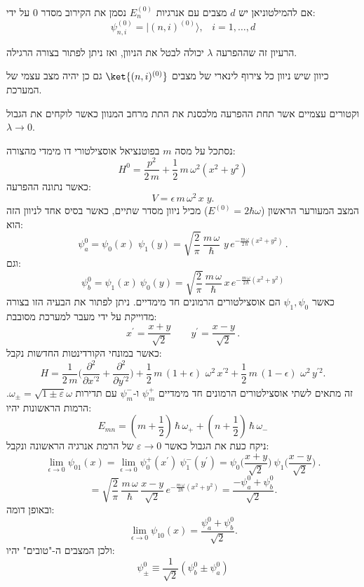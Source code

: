 \documentclass{tstextbook}
\begin{document}
\begin{symbolize}
אם להמילטוניאן יש \(d\) מצבים עם אנרגיות \(E_{n}^{(0)}\) נסמן את הקירוב מסדר 0 על ידי:
$$\psi_{n,i}^{(0)}=|(n,i)^{(0)}\rangle,\;\;\;i=1,\ldots,d$$

\end{symbolize}
הרעיון זה שההפרעה \(\lambda\) יכולה לבטל את הניוון, ואז ניתן לפתור בצורה הרגילה.

\begin{proposition}
כיוון שיש ניוון כל צירוף לינארי של מצבים \(\ket{(n,i)^{(0)}}\) גם כן יהיה מצב עצמי של המערכת.

\end{proposition}
\begin{definition}
וקטורים עצמיים אשר תחת ההפרעה מלכסנת את התת מרחב המנוון כאשר לוקחים את הגבול \(\lambda\to 0\).

\end{definition}
\begin{example}
נסתכל על מסה \(m\) בפוטנציאל אוסצילטורי דו מימדי מהצורה:
$$H^{0}=\frac{p^{2}}{2\,m}+\frac{1}{2}\,m\,\omega^{2}\left(x^{2}+y^{2}\right)$$
כאשר נתונה ההפרעה:
$$V=\epsilon\,m\,\omega^{2}\,x\;y.$$
המצב המעורער הראשון (\(E^{(0)}=2\hbar \omega\)) מכיל ניוון מסדר שתיים, כאשר בסיס אחד לניוון הזה הוא:
$$\psi_{a}^{0}=\psi_{0}(x)\,\,\psi_{1}(y)=\sqrt{\frac{2}{\pi}}\,\frac{m\,\omega}{\hbar}\,\,y\,e^{-\frac{m\,\omega}{2\,\hbar}\left(x^{2}+y^{2}\right)}\,.$$
וגם:
$$\psi_{b}^{0}=\psi_{1}(x)\ \psi_{0}(y)=\sqrt{\frac{2}{\pi}}\,\frac{m\,\omega}{\hbar}\,x\,e^{-\frac{m\,\omega}{2\,\hbar}\left(x^{2}+y^{2}\right)}$$
כאשר \(\psi_{1},\psi_{0}\) הם אוסצילטורים הרמונים חד מימדיים. ניתן לפתור את הבעיה הזו בצורה מדוייקת על ידי מעבר למערכת מסובבת:
$$x^{\prime}=\frac{x+y}{\sqrt{2}}\qquad y^{\prime}=\frac{x-y}{\sqrt{2}}\,.$$
כאשר במונחי הקורדינטות החדשות נקבל:
$$H=\frac{1}{2\,m}\bigg(\frac{\partial^{2}}{\partial x^{\prime2}}+\frac{\partial^{2}}{\partial y^{\prime2}}\bigg)+\frac{1}{2}\,m\,(1+\epsilon)\,\,\omega^{2}\,x^{\prime2}+\frac{1}{2}\,m\,(1-\epsilon)\,\,\omega^{2}\,y^{\prime2}.$$
זה מתאים לשתי אוסצילטורים הרמונים חד מימדיים \(\psi_{m}^{+}\) ו-\(\psi_{m}^{-}\) עם תדירות \(\omega_{\pm}=\sqrt{ 1\pm \varepsilon }\omega\). הרמות הראשונות יהיו:
$$E_{m n}=\left(m+\frac{1}{2}\right)\,\hbar\,\omega_{+}+\left(n+\frac{1}{2}\right)\,\hbar\,\omega_{-}$$
ניקח כעת את הגבול כאשר \(\varepsilon\to 0\) של הרמת אנרגיה הראשונה ונקבל:
$$\operatorname*{lim}_{\epsilon\rightarrow0}\psi_{01}(x)=\operatorname*{lim}_{\epsilon\rightarrow0}\psi_{0}^{+}(x^{\prime})\ \psi_{1}^{-}(y^{\prime})=\psi_{0}\bigg(\frac{x+y}{\sqrt{2}}\bigg)\ \psi_{1}\bigg(\frac{x-y}{\sqrt{2}}\bigg)\ .$$$$=\sqrt{\frac{2}{\pi}}\,\frac{m\,\omega}{\hbar}\,\frac{x-y}{\sqrt{2}}\,e^{-\frac{m\,\omega}{2\hbar}\left(x^{2}+y^{2}\right)}=\frac{-\psi_{a}^{0}+\psi_{b}^{0}}{\sqrt{2}}.$$
ובאופן דומה:
$$\operatorname*{lim}_{\epsilon\rightarrow0}\psi_{10}(x)=\frac{\psi_{a}^{0}+\psi_{b}^{0}}{\sqrt{2}}.$$
ולכן המצבים ה-"טובים" יהיו:
$$\psi_{\pm}^{0}\equiv\frac{1}{\sqrt{2}}\left(\psi_{b}^{0}\pm\psi_{a}^{0}\right)$$

\end{example}
\end{document}
